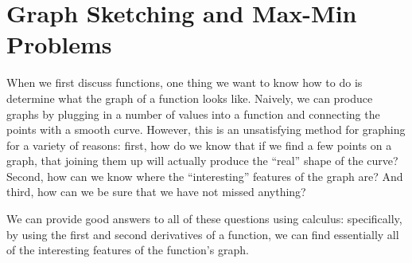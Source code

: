 
\chapter{Graph Sketching and Max-Min Problems}
\label{ch:graph-sketching}
When we first discuss functions, one thing we want to know how to do is
determine what the graph of a function looks like.  Naively, we can produce
graphs by plugging in a number of values into a function and connecting the
points with a smooth curve. However, this is an unsatisfying method for graphing
for a variety of reasons: first, how do we know that if we find a few points on
a graph, that joining them up will actually produce the ``real'' shape of the
curve?  Second, how can we know where the ``interesting'' features of the graph
are? And third, how can we be sure that we have not missed anything?


We can provide good answers to all of these questions using calculus:
specifically, by using the first and second derivatives of a function, we can
find essentially all of the interesting features of the function's graph.




